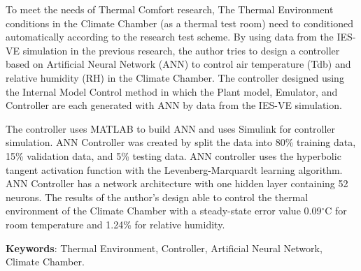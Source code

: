 To meet the needs of Thermal Comfort research, The Thermal Environment conditions in the Climate Chamber (as a thermal test room) need to conditioned automatically according to the research test scheme. By using data from the IES-VE simulation in the previous research\cite{skripsiIchfan}, the author tries to design a controller based on Artificial Neural Network (ANN) to control air temperature (Tdb) and relative humidity (RH) in the Climate Chamber. The controller designed using the Internal Model Control method in which the Plant model, Emulator, and Controller are each generated with ANN by data from the IES-VE simulation.

The controller uses MATLAB to build ANN and uses Simulink for controller simulation. ANN Controller was created by split the data into 80\% training data, 15\% validation data, and 5\% testing data. ANN controller uses the hyperbolic tangent activation function with the Levenberg-Marquardt learning algorithm. ANN Controller has a network architecture with one hidden layer containing 52 neurons. The results of the author's design able to control the thermal environment of the Climate Chamber with a steady-state error value 0.09$^\circ$C for room temperature and 1.24\% for relative humidity.

\vspace{0.5cm}
\hspace{-1.2cm}
\textbf{Keywords}: Thermal Environment, Controller, Artificial Neural Network, Climate Chamber.

